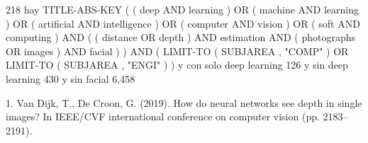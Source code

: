 218 hay TITLE-ABS-KEY ( ( deep AND learning ) OR ( machine AND learning ) OR ( artificial AND intelligence ) OR ( computer AND vision ) OR ( soft AND computing ) AND ( ( distance OR depth ) AND estimation AND ( photographs OR images ) AND facial ) ) AND ( LIMIT-TO ( SUBJAREA , "COMP" ) OR LIMIT-TO ( SUBJAREA , "ENGI" ) )
y con solo deep learning 126
y sin deep learning 430
y sin facial 6,458 

1. Van Dijk, T.,  De Croon, G. (2019). How do neural networks see depth in single images? In IEEE/CVF international conference on computer vision (pp. 2183–2191).
